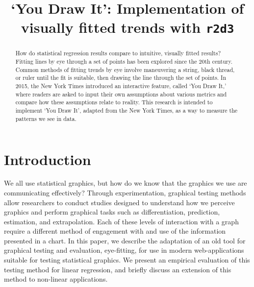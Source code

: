 \documentclass[
  letterpaper,
  DIV=11,
  numbers=noendperiod]{scrartcl}
\title{`You Draw It': Implementation of visually fitted trends with
\texttt{r2d3}}
\author{}
\date{}
\newcommand{\svp}[1]{{\textcolor{RedOrange}{#1}}}
\begin{document}
\maketitle
\begin{abstract}
How do statistical regression results compare to intuitive, visually
fitted results? Fitting lines by eye through a set of points has been
explored since the 20th century. Common methods of fitting trends by eye
involve maneuvering a string, black thread, or ruler until the fit is
suitable, then drawing the line through the set of points. In 2015, the
New York Times introduced an interactive feature, called `You Draw It,'
where readers are asked to input their own assumptions about various
metrics and compare how these assumptions relate to reality. This
research is intended to implement `You Draw It', adapted from the New
York Times, as a way to measure the patterns we see in data.
\end{abstract}
\ifdefined\Shaded\renewenvironment{Shaded}{\begin{tcolorbox}[interior hidden, frame hidden, enhanced, boxrule=0pt, borderline west={3pt}{0pt}{shadecolor}, sharp corners, breakable]}{\end{tcolorbox}}\fi

\hypertarget{introduction}{%
\section{Introduction}\label{introduction}}

We all use statistical graphics, but how do we know that the graphics we
use are communicating \svp{effectively}? Through experimentation,
graphical testing methods allow researchers to conduct studies
\svp{designed to understand how we perceive graphics and perform graphical tasks}
such as differentiation, prediction, estimation, and extrapolation.
\svp{Each of these levels of interaction with a graph require a different method of engagement with and use of the information presented in a chart.}
\svp{In this paper, we describe the adaptation of an old tool for graphical testing and evaluation, eye-fitting, for use in modern web-applications suitable for testing statistical graphics. 
We present an empirical evaluation of this testing method for linear regression, and briefly discuss an extension of this method to non-linear applications.}
\end{document}
